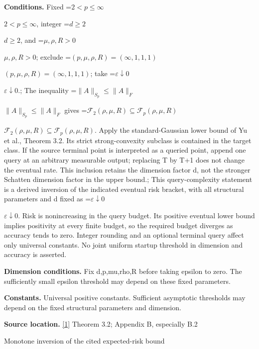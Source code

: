 \documentclass[10pt,a4paper]{article}
\newcommand{\AtlasMath}[1]{\par\begingroup\centering\setbox0=\hbox{$\displaystyle #1$}\ifdim\wd0>1.4\linewidth\typeout{ATLAS WIDE FORMULA: \the\wd0}\fi\ifdim\wd0>\linewidth\resizebox{\linewidth}{!}{\box0}\else\box0\fi\par\endgroup}
\newcommand{\AtlasInlineMath}[1]{\begingroup\setbox0=\hbox{$#1$}\ifdim\wd0>.4\linewidth\endgroup\AtlasMath{#1}\else\endgroup$#1$\fi}
\begin{document}
\textbf{Conditions.} Fixed \AtlasInlineMath{2<p\le\infty}, integer \AtlasInlineMath{d\ge2}, and \AtlasInlineMath{\mu,\rho,R>0}; exclude \AtlasInlineMath{(p,\mu,\rho,R)=(\infty,1,1,1)}; take \AtlasInlineMath{\varepsilon\downarrow0}.; The inequality \AtlasInlineMath{\|A\|_{S_p}\le\|A\|_F} gives \AtlasInlineMath{\mathcal F_2(\rho,\mu,R)\subseteq\mathcal F_p(\rho,\mu,R)}. Apply the standard-Gaussian lower bound of Yu et al., Theorem 3.2. Its strict strong-convexity subclass is contained in the target class. If the source terminal point is interpreted as a queried point, append one query at an arbitrary measurable output; replacing T by T+1 does not change the eventual rate. This inclusion retains the dimension factor d, not the stronger Schatten dimension factor in the upper bound.; This query-complexity statement is a derived inversion of the indicated eventual risk bracket, with all structural parameters and d fixed as \AtlasInlineMath{\varepsilon\downarrow0}. Risk is nonincreasing in the query budget. Its positive eventual lower bound implies positivity at every finite budget, so the required budget diverges as accuracy tends to zero. Integer rounding and an optional terminal query affect only universal constants. No joint uniform startup threshold in dimension and accuracy is asserted.



\textbf{Dimension conditions.} Fix d,p,mu,rho,R before taking epsilon to zero. The sufficiently small epsilon threshold may depend on these fixed parameters.



\textbf{Constants.} Universal positive constants. Sufficient asymptotic thresholds may depend on the fixed structural parameters and dimension.



\textbf{Source location.} \href{https://papers.nips.cc/paper_files/paper/2024/file/b444ad72520a5f5c467343be88e352ed-Paper-Conference.pdf}{[1]} Theorem 3.2; Appendix B, especially B.2



Monotone inversion of the cited expected-risk bound
\end{document}
